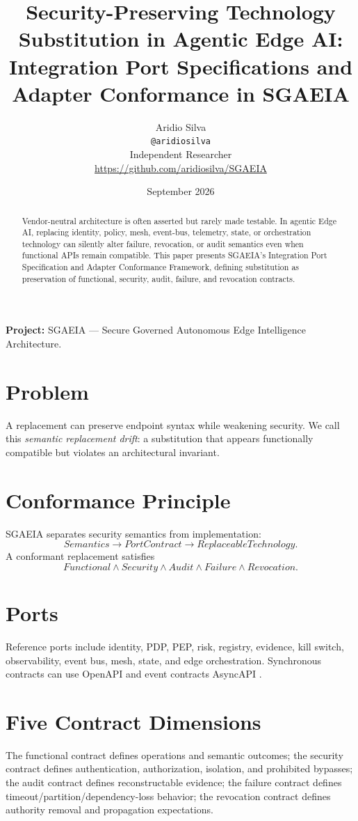 \documentclass[11pt]{article}
\author{Aridio Silva\\\texttt{@aridiosilva}\\Independent Researcher\\\url{https://github.com/aridiosilva/SGAEIA}}
\date{September 2026}
\title{Security-Preserving Technology Substitution in Agentic Edge AI: Integration Port Specifications and Adapter Conformance in SGAEIA}
\begin{document}
\maketitle
\begin{abstract}
Vendor-neutral architecture is often asserted but rarely made testable. In agentic Edge AI, replacing identity, policy, mesh, event-bus, telemetry, state, or orchestration technology can silently alter failure, revocation, or audit semantics even when functional APIs remain compatible. This paper presents SGAEIA's Integration Port Specification and Adapter Conformance Framework, defining substitution as preservation of functional, security, audit, failure, and revocation contracts.
\end{abstract}
\noindent\textbf{Project:} SGAEIA --- Secure Governed Autonomous Edge Intelligence Architecture.\\

\section{Problem}
A replacement can preserve endpoint syntax while weakening security. We call this \emph{semantic replacement drift}: a substitution that appears functionally compatible but violates an architectural invariant.

\section{Conformance Principle}
SGAEIA separates security semantics from implementation:
\[
Semantics\rightarrow PortContract\rightarrow ReplaceableTechnology.
\]
A conformant replacement satisfies
\[
Functional\land Security\land Audit\land Failure\land Revocation.
\]

\section{Ports}
Reference ports include identity, PDP, PEP, risk, registry, evidence, kill switch, observability, event bus, mesh, state, and edge orchestration. Synchronous contracts can use OpenAPI and event contracts AsyncAPI \cite{openapi,asyncapi}.

\section{Five Contract Dimensions}
The functional contract defines operations and semantic outcomes; the security contract defines authentication, authorization, isolation, and prohibited bypasses; the audit contract defines reconstructable evidence; the failure contract defines timeout/partition/dependency-loss behavior; the revocation contract defines authority removal and propagation expectations.
\end{document}
